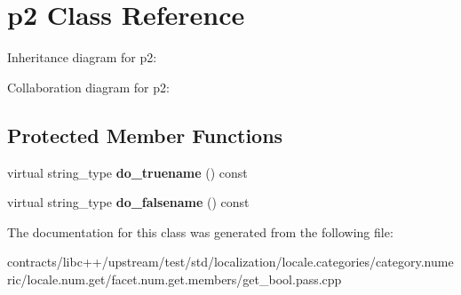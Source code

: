 \hypertarget{classp2}{}\section{p2 Class Reference}
\label{classp2}


Inheritance diagram for p2\+:


Collaboration diagram for p2\+:
\subsection*{Protected Member Functions}
\begin{DoxyCompactItemize}
\item 
\mbox{\label{classp2_a4675fa5874c1b59623e187ec37d83a20}} 
virtual string\+\_\+type {\bfseries do\+\_\+truename} () const
\item 
\mbox{\label{classp2_aeb0e49cc0253ae29115cf3ada4abd0b3}} 
virtual string\+\_\+type {\bfseries do\+\_\+falsename} () const
\end{DoxyCompactItemize}


The documentation for this class was generated from the following file\+:\begin{DoxyCompactItemize}
\item 
contracts/libc++/upstream/test/std/localization/locale.\+categories/category.\+numeric/locale.\+num.\+get/facet.\+num.\+get.\+members/get\+\_\+bool.\+pass.\+cpp\end{DoxyCompactItemize}
